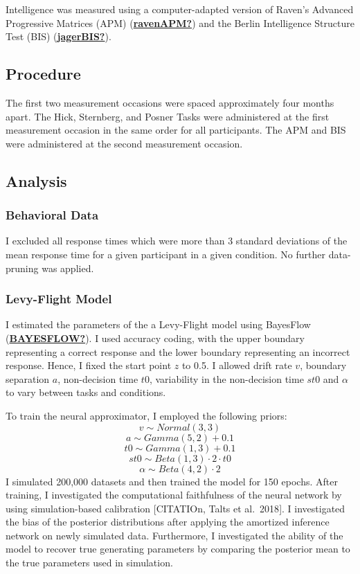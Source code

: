 \documentclass[
  man,floatsintext]{apa7}
\begin{document}
Intelligence was measured using a computer-adapted version of Raven's Advanced Progressive Matrices (APM) (\protect\hyperlink{ref-ravenAPM}{\textbf{ravenAPM?}}) and the Berlin Intelligence Structure Test (BIS) (\protect\hyperlink{ref-jagerBIS}{\textbf{jagerBIS?}}).

\hypertarget{procedure}{%
\subsection{Procedure}\label{procedure}}

The first two measurement occasions were spaced approximately four months apart. The Hick, Sternberg, and Posner Tasks were administered at the first measurement occasion in the same order for all participants. The APM and BIS were administered at the second measurement occasion.

\hypertarget{analysis}{%
\subsection{Analysis}\label{analysis}}

\hypertarget{behavioral-data}{%
\subsubsection{Behavioral Data}\label{behavioral-data}}

I excluded all response times which were more than 3 standard deviations of the mean response time for a given participant in a given condition. No further data-pruning was applied.

\hypertarget{levy-flight-model}{%
\subsubsection{Levy-Flight Model}\label{levy-flight-model}}

I estimated the parameters of the a Levy-Flight model using BayesFlow (\protect\hyperlink{ref-BAYESFLOW}{\textbf{BAYESFLOW?}}). I used accuracy coding, with the upper boundary representing a correct response and the lower boundary representing an incorrect response. Hence, I fixed the start point \(z\) to 0.5. I allowed drift rate \(v\), boundary separation \(a\), non-decision time \(t0\), variability in the non-decision time \(st0\) and \(\alpha\) to vary between tasks and conditions.

To train the neural approximator, I employed the following priors:
\[v \sim Normal(3,3)\]
\[a \sim Gamma(5, 2) + 0.1\]
\[t0 \sim Gamma(1, 3) + 0.1\]
\[st0 \sim Beta(1, 3) \cdot 2 \cdot t0\]
\[\alpha \sim Beta(4, 2) \cdot 2\]
I simulated 200,000 datasets and then trained the model for 150 epochs. After training, I investigated the computational faithfulness of the neural network by using simulation-based calibration {[}CITATIOn, Talts et al.~2018{]}. I investigated the bias of the posterior distributions after applying the amortized inference network on newly simulated data. Furthermore, I investigated the ability of the model to recover true generating parameters by comparing the posterior mean to the true parameters used in simulation.
\end{document}
